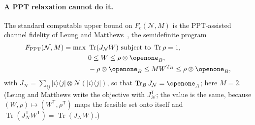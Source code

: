 \documentclass[aps,pra,twocolumn,superscriptaddress,nofootinbib,longbibliography,floatfix]{revtex4-2}
\newcommand{\ket}[1]{|#1\rangle}
\newcommand{\bra}[1]{\langle #1|}
\newcommand{\tr}{\operatorname{Tr}}
\begin{document}
\paragraph*{A PPT relaxation cannot do it.} The standard computable upper bound on $F_c(\mathcal N,M)$ is the PPT-assisted channel fidelity of Leung and Matthews~\cite{leung2015power}, the semidefinite program
\begin{align*}
F_{\mathrm{PPT}}(\mathcal N,M)=\max\ &\tr(J_{\mathcal N}W)\ \text{subject to}\ \tr\rho=1,\\
&0\le W\le\rho\otimes\openone_B,\\
&-\rho\otimes\openone_B\le MW^{T_B}\le\rho\otimes\openone_B,
\end{align*}
with $J_{\mathcal N}=\sum_{ij}\ket i\!\bra j\otimes\mathcal N(\ket i\!\bra j)$, so that $\tr_BJ_{\mathcal N}=\openone_A$; here $M=2$. (Leung and Matthews write the objective with $J_{\mathcal N}^{\mathsf T}$; the value is the same, because $(W,\rho)\mapsto(W^{\mathsf T},\rho^{\mathsf T})$ maps the feasible set onto itself and $\tr(J_{\mathcal N}^{\mathsf T}W^{\mathsf T})=\tr(J_{\mathcal N}W)$.)
\end{document}
